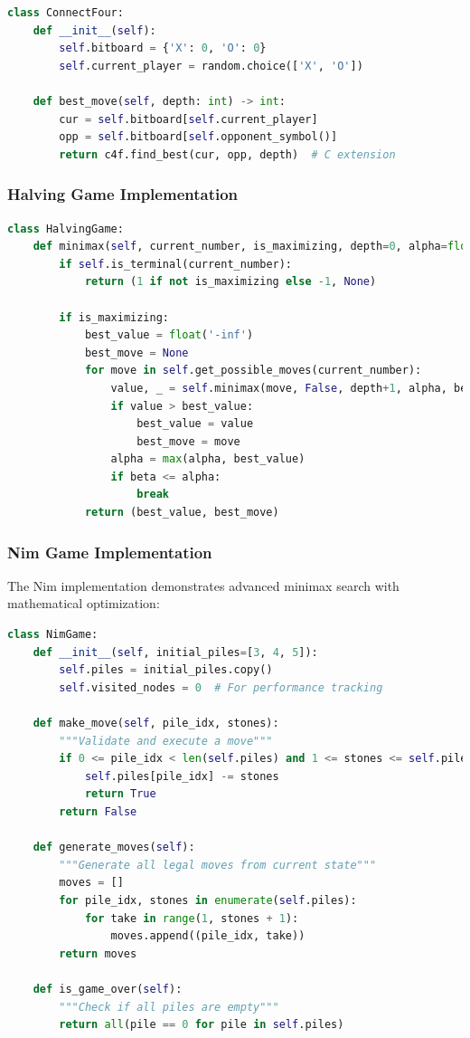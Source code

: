 \documentclass[12pt]{article}
\begin{document}
\begin{lstlisting}[language=Python, basicstyle=\small]
class ConnectFour:
    def __init__(self):
        self.bitboard = {'X': 0, 'O': 0}
        self.current_player = random.choice(['X', 'O'])
    
    def best_move(self, depth: int) -> int:
        cur = self.bitboard[self.current_player]
        opp = self.bitboard[self.opponent_symbol()]
        return c4f.find_best(cur, opp, depth)  # C extension
\end{lstlisting}

\subsubsection{Halving Game Implementation}

\begin{lstlisting}[language=Python, basicstyle=\small]
class HalvingGame:
    def minimax(self, current_number, is_maximizing, depth=0, alpha=float('-inf'), beta=float('inf')):
        if self.is_terminal(current_number):
            return (1 if not is_maximizing else -1, None)
        
        if is_maximizing:
            best_value = float('-inf')
            best_move = None
            for move in self.get_possible_moves(current_number):
                value, _ = self.minimax(move, False, depth+1, alpha, beta)
                if value > best_value:
                    best_value = value
                    best_move = move
                alpha = max(alpha, best_value)
                if beta <= alpha:
                    break
            return (best_value, best_move)
\end{lstlisting}

\subsubsection{Nim Game Implementation}

The Nim implementation demonstrates advanced minimax search with mathematical optimization:

\begin{lstlisting}[language=Python, basicstyle=\small]
class NimGame:
    def __init__(self, initial_piles=[3, 4, 5]):
        self.piles = initial_piles.copy()
        self.visited_nodes = 0  # For performance tracking
        
    def make_move(self, pile_idx, stones):
        """Validate and execute a move"""
        if 0 <= pile_idx < len(self.piles) and 1 <= stones <= self.piles[pile_idx]:
            self.piles[pile_idx] -= stones
            return True
        return False
    
    def generate_moves(self):
        """Generate all legal moves from current state"""
        moves = []
        for pile_idx, stones in enumerate(self.piles):
            for take in range(1, stones + 1):
                moves.append((pile_idx, take))
        return moves
    
    def is_game_over(self):
        """Check if all piles are empty"""
        return all(pile == 0 for pile in self.piles)
\end{lstlisting}
\end{document}
